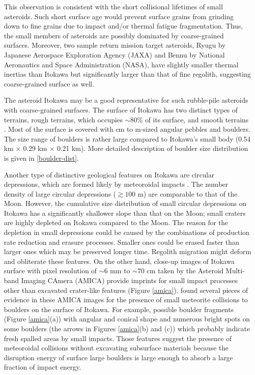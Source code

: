 \documentclass[3p,authoryear]{elsarticle}
\begin{document}
This observation is consistent with the short collisional lifetimes of small asteroids. 
Such short surface age would prevent surface grains from grinding down to fine grains due to impact and/or thermal fatigue fragmentation.
Thus, the small members of asteroids are possibly dominated by coarse-grained surfaces.
Moreover, two sample return mission target asteroids, Ryugu by Japanese Aerospace Exploration Agency (JAXA) and Bennu by National Aeronautics
and Space Administration (NASA), have slightly smaller thermal inertias \citep{emery2014, hasegawa2008} than Itokawa but significantly larger than
that of fine regolith, suggesting coarse-grained surface as well.

The asteroid Itokawa may be a good representative for such rubble-pile asteroids with coarse-grained surfaces.
The surface of Itokawa has two distinct types of terrains, rough terrains, which occupies $\sim 80\%$ of its surface, and smooth terrains \citep{saito2006}.
Most of the surface is covered with cm to m-sized angular pebbles and boulders. The size range of boulders is rather large compared to Itokawa's small body (0.54 km $\times$ 0.29 km $\times$ 0.21 km). More detailed description of boulder size distribution is given in \ref{boulder-dist}.

Another type of distinctive geological features on Itokawa are circular depressions, which are formed likely by meteoroidal impacts \citep{hirata2009}.
The number density of large circular depressions ($\gtrsim 100$ m) are comparable to that of the Moon.
However, the cumulative size distribution of small circular depressions on Itokawa has a significantly shallower slope than that on the Moon;
small craters are highly depleted on Itokawa compared to the Moon.
The reason for the depletion in small depressions could be caused by the combinations of production rate reduction and erasure processes.
Smaller ones could be erased faster than larger ones which may be preserved longer time. Regolith migration \citep{miyamoto2007, tancredi2015}
might deform and obliterate these features.
On the other hand, close-up images of Itokawa surface with pixel resolution of $\sim 6$ mm to $\sim70$ cm taken by the Asteroid Multi-band Imaging
CAmera (AMICA) provide imprints for small impact processes other than excavated crater-like features (Figure \ref{amica}). \citet{nakamura2008} found
several pieces of evidence in these AMICA images for the presence of small meteorite collisions to boulders on the surface of Itokawa.
For example, possible boulder fragments (Figure \ref{amica}(a)) with angular and conical shape and numerous bright spots  on some boulders (the arrows in Figures \ref{amica}(b) and (c)) which probably indicate fresh spalled areas by small impacts.
Those features suggest the presence of meteoroidal collisions without excavating subsurface materials because the disruption energy of surface large boulders is large enough to absorb a large fraction of impact energy.
\end{document}
